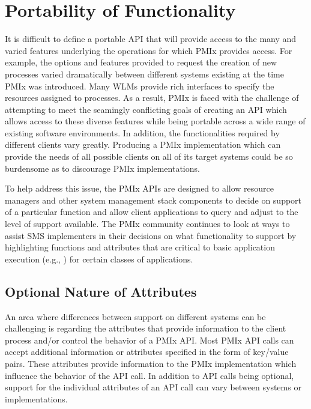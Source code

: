\section{Portability of Functionality}
\label{chap:intro:not_supported}

It is difficult to define a portable \ac{API} that will provide access to the many             
and varied features underlying the operations for which \ac{PMIx} provides access.
For example, the options and features provided to request the creation
of new processes varied dramatically between different systems existing
at the time \ac{PMIx} was introduced.  Many \acp{WLM} provide rich interfaces
to specify the resources assigned to processes.
As a result, \ac{PMIx} is faced with the challenge
of attempting to meet the seamingly conflicting goals of creating an \ac{API} which allows
access to these diverse features while being portable across a wide range of
existing software environments. In addition, the functionalities required by different 
clients vary greatly.  Producing a \ac{PMIx} implementation
which can provide the needs of all possible clients on all of its target systems
could be so burdensome as to discourage \ac{PMIx} implementations.

To help address this issue, the \ac{PMIx} \acp{API} are designed to allow resource managers 
and other system management stack components to decide on support of a 
particular function and allow client applications to query and adjust to the level of support available. 
The \ac{PMIx} community continues to look at ways to assist \ac{SMS} implementers in their decisions 
on what functionality to support by highlighting functions and attributes that are 
critical to basic application execution (e.g., ) for certain classes of applications.

\subsection{Optional Nature of Attributes}

An area where differences between support on different systems can be challenging is regarding the attributes that provide information to the client process and/or control the behavior of a \ac{PMIx} \ac{API}.  Most
\ac{PMIx} \ac{API} calls can accept additional information or attributes specified in the form of 
key/value pairs. These attributes provide information to the \ac{PMIx} implementation which influence the 
behavior of the \ac{API} call.  In addition to \ac{API} calls being optional, support for the 
individual attributes of an \ac{API} call can vary between systems or implementations.   

